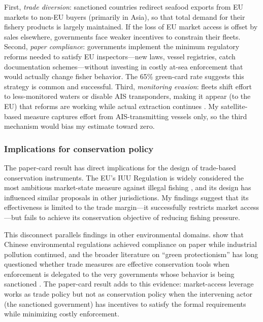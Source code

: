 \documentclass[12pt]{article}
\begin{document}
First, \textit{trade diversion}: sanctioned countries redirect seafood exports from EU markets to non-EU buyers (primarily in Asia), so that total demand for their fishery products is largely maintained. If the loss of EU market access is offset by sales elsewhere, governments face weaker incentives to constrain their fleets. Second, \textit{paper compliance}: governments implement the minimum regulatory reforms needed to satisfy EU inspectors---new laws, vessel registries, catch documentation schemes---without investing in costly at-sea enforcement that would actually change fisher behavior. The 65\% green-card rate suggests this strategy is common and successful. Third, \textit{monitoring evasion}: fleets shift effort to less-monitored waters or disable AIS transponders, making it appear (to the EU) that reforms are working while actual extraction continues \citep{boerder2018global}. My satellite-based measure captures effort from AIS-transmitting vessels only, so the third mechanism would bias my estimate toward zero.

\subsubsection*{Implications for conservation policy} The paper-card result has direct implications for the design of trade-based conservation instruments. The EU's IUU Regulation is widely considered the most ambitious market-state measure against illegal fishing \citep{fernandes2011does}, and its design has influenced similar proposals in other jurisdictions. My findings suggest that its effectiveness is limited to the trade margin---it successfully restricts market access---but fails to achieve its conservation objective of reducing fishing pressure.

This disconnect parallels findings in other environmental domains. \citet{he2020watering} show that Chinese environmental regulations achieved compliance on paper while industrial pollution continued, and the broader literature on ``green protectionism'' has long questioned whether trade measures are effective conservation tools when enforcement is delegated to the very governments whose behavior is being sanctioned \citep{costello2008can, hilborn2020effective}. The paper-card result adds to this evidence: market-access leverage works as trade policy but not as conservation policy when the intervening actor (the sanctioned government) has incentives to satisfy the formal requirements while minimizing costly enforcement.
\end{document}
